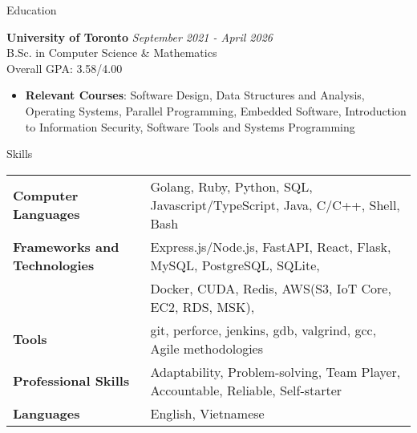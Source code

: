 \documentclass[
	11pt, %
]{resume} %
\begin{document}

\begin{rSection}{Education}
	
	\textbf{University of Toronto} \hfill \textit{September 2021 - April 2026} \\ 
	B.Sc. in Computer Science \& Mathematics \\
	Overall GPA: 3.58/4.00 
	
	\begin{itemize}
		\item \textbf{Relevant Courses}: Software Design, Data Structures and Analysis, Operating Systems, Parallel Programming, Embedded Software, Introduction to Information Security, Software Tools and Systems Programming
	\end{itemize}
\end{rSection}

\begin{rSection}{Skills}
	\begin{tabular}{@{} >{\bfseries}l @{\hspace{6ex}} l @{}}
		Computer Languages & Golang, Ruby, Python, SQL, Javascript/TypeScript, Java, C/C++, Shell, Bash \\

		Frameworks and Technologies & Express.js/Node.js, FastAPI, React, Flask,  MySQL, PostgreSQL, SQLite, \\ 
																& Docker, CUDA, Redis, AWS(S3, IoT Core, EC2, RDS, MSK),\\

		Tools & git, perforce, jenkins, gdb, valgrind, gcc, Agile methodologies\\
		Professional Skills & Adaptability, Problem-solving, Team Player, Accountable, Reliable, Self-starter \\
		Languages & English, Vietnamese
	\end{tabular}

\end{rSection}
\end{document}
